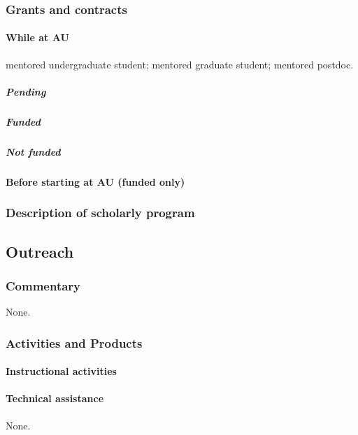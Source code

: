 \subsubsection{Grants and contracts}

\paragraph{While at AU}
\ugsymbol{}mentored undergraduate student;
\phdsymbol{}mentored graduate student;
\postdocsymbol{}mentored postdoc.

\subparagraph*{Pending}


\subparagraph*{Funded}


\subparagraph{Not funded}


\paragraph{Before starting at AU (funded only)}


\subsubsection{Description of scholarly program}


\subsection{Outreach}

\subsubsection{Commentary}
None.

\subsubsection{Activities and Products}

\paragraph{Instructional activities}


\paragraph{Technical assistance}
None.

